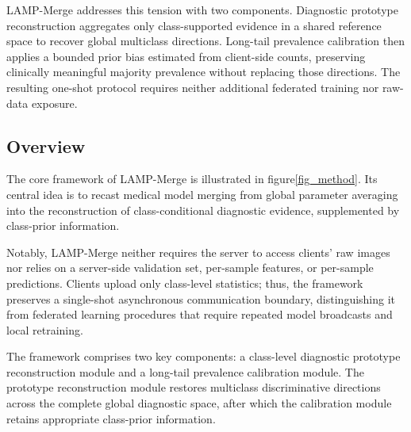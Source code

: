 \documentclass[letterpaper]{article} %
\begin{document}
LAMP-Merge addresses this tension with two components. Diagnostic prototype reconstruction aggregates only class-supported evidence in a shared reference space to recover global multiclass directions. Long-tail prevalence calibration then applies a bounded prior bias estimated from client-side counts, preserving clinically meaningful majority prevalence without replacing those directions. The resulting one-shot protocol requires neither additional federated training nor raw-data exposure.

\subsection{Overview}

The core framework of LAMP-Merge is illustrated in figure\ref{fig_method}. Its central idea is to recast medical model merging from global parameter averaging into the reconstruction of class-conditional diagnostic evidence, supplemented by class-prior information.

Notably, LAMP-Merge neither requires the server to access clients’ raw images nor relies on a server-side validation set, per-sample features, or per-sample predictions. Clients upload only class-level statistics; thus, the framework preserves a single-shot asynchronous communication boundary, distinguishing it from federated learning procedures that require repeated model broadcasts and local retraining.

The framework comprises two key components: a class-level diagnostic prototype reconstruction module and a long-tail prevalence calibration module. The prototype reconstruction module restores multiclass discriminative directions across the complete global diagnostic space, after which the calibration module retains appropriate class-prior information.
\end{document}
